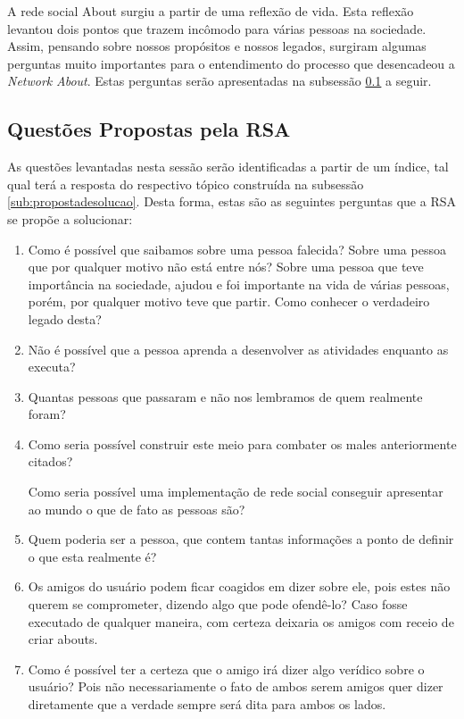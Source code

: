 A rede social About surgiu a partir de uma reflexão de vida. Esta reflexão
levantou dois pontos que trazem incômodo para várias pessoas na sociedade.
Assim, pensando sobre
nossos propósitos e nossos legados, surgiram algumas perguntas muito importantes
para o entendimento do processo que desencadeou a \textit{Network} \textit{About}.
Estas perguntas serão apresentadas na subsessão \ref{sub:questoesrsa} a
seguir.


\subsection{Questões Propostas pela RSA}
\label{sub:questoesrsa}
As questões levantadas nesta sessão serão identificadas a partir de um índice,
tal qual terá a resposta do respectivo tópico
construída na subsessão \ref{sub:propostadesolucao}. Desta forma, estas
são as seguintes perguntas que a RSA se propõe a solucionar:

\begin{enumerate}
    \item Como é possível que saibamos sobre uma pessoa falecida? Sobre uma pessoa que por 
        qualquer motivo não está entre nós? Sobre uma pessoa que teve importância na 
        sociedade, ajudou e foi importante na vida de várias pessoas, porém, por 
        qualquer motivo teve que partir. Como conhecer o verdadeiro legado desta?
    \item Não é possível que a pessoa aprenda a desenvolver as atividades enquanto as executa?
    \item Quantas pessoas que passaram e não nos lembramos de quem realmente foram?
    \item Como seria possível construir este meio para combater os males anteriormente citados?

        Como seria possível uma implementação de rede social conseguir apresentar ao mundo o que
        de fato as pessoas são?
    \item Quem poderia ser a pessoa, que contem tantas informações a ponto de definir o que esta realmente é?

    \item Os amigos do usuário podem ficar coagidos em dizer sobre ele, pois estes não querem se comprometer,
        dizendo algo que pode ofendê-lo? Caso fosse executado de qualquer maneira, com certeza deixaria os amigos
        com receio de criar abouts.
    \item Como é possível ter a certeza que o amigo irá dizer algo verídico sobre o usuário? Pois não necessariamente o fato
        de ambos serem amigos quer dizer diretamente que a verdade sempre será dita para ambos os lados.
\end{enumerate}


